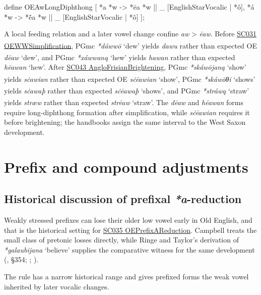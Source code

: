 \documentclass[
  british,
  a4paper,
  openany]{book}
\providecommand{\Pred}[1]{\textsuperscript{\dag}\emph{#1}}
\providecommand{\Recon}[1]{\emph{*#1}}
{\catcode`→=\active \global\def→{\ensuremath{\rightarrow}}}
\providecommand{\texorpdfstring}[2]{#1}
\providecommand{\Pred}[1]{\textsuperscript{\dag}\emph{#1}}
\providecommand{\Recon}[1]{\emph{*#1}}
{\catcode`→=\active \global\def→{\ensuremath{\rightarrow}}}
\begin{document}
\begin{ReaderFacingFoma}
define OEAwLongDiphthong [
    {*a} {*w} -> {*ēa} {*w} || _ [EnglishStarVocalic | {*ô}],
    {*á} {*w} -> {*ḗa} {*w} || _ [EnglishStarVocalic | {*ô}]
];
\end{ReaderFacingFoma}

A local feeding relation and a later vowel change confine \emph{aw}
\textgreater{} \emph{ēaw}. Before
\hyperref[rule-OEWWSimplification]{SC031 OEWWSimplification}, PGmc
\Recon{dáwwō} `dew' yields \Pred{dawu} rather than expected OE
\emph{dēaw} `dew', and PGmc \Recon{xáwwaną} `hew' yields \Pred{hawan}
rather than expected \emph{hēawan} `hew'. After
\hyperref[rule-AngloFrisianBrightening]{SC043 AngloFrisianBrightening},
PGmc \Recon{skáwōjaną} `show' yields \Pred{sċawian} rather than expected
OE \emph{sċēawian} `show', PGmc \Recon{skáwōθi} `shows' yields
\Pred{sċawaþ} rather than expected \emph{sċēawaþ} `shows', and PGmc
\Recon{stráwą} `straw' yields \Pred{stræw} rather than expected
\emph{strēaw} `straw'. The \emph{dēaw} and \emph{hēawan} forms require
long-diphthong formation after simplification, while \emph{sċēawian}
requires it before brightening; the handbooks assign the same interval
to the West Saxon development.

\newpage

\section{Prefix and compound
adjustments}\label{prefix-and-compound-adjustments}

\subsection{\texorpdfstring{Historical discussion of prefixal
\emph{*a}-reduction}{Historical discussion of prefixal -reduction}}\label{historical-discussion-of-prefixal--reduction}

Weakly stressed prefixes can lose their older low vowel early in Old
English, and that is the historical setting for
\hyperref[rule-OEPrefixAReduction]{SC035 OEPrefixAReduction}. Campbell
treats the small class of pretonic losses directly, while Ringe and
Taylor's derivation of \Recon{galaubijana} `believe' supplies the
comparative witness for the same development
(, §354;
;
).

The rule has a narrow historical range and gives prefixed forms the weak
vowel inherited by later vocalic changes.
\end{document}
